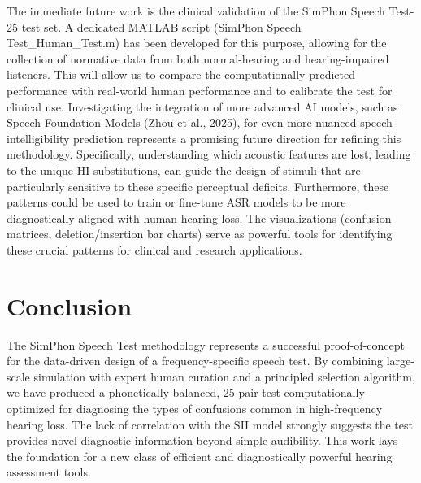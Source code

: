 \documentclass{article}
\begin{document}
The immediate future work is the clinical validation of the SimPhon Speech Test-25 test set. A dedicated MATLAB script (SimPhon Speech Test\_Human\_Test.m) has been developed for this purpose, allowing for the collection of normative data from both normal-hearing and hearing-impaired listeners. This will allow us to compare the computationally-predicted performance with real-world human performance and to calibrate the test for clinical use. Investigating the integration of more advanced AI models, such as Speech Foundation Models (Zhou et al., 2025), for even more nuanced speech intelligibility prediction represents a promising future direction for refining this methodology. Specifically, understanding which acoustic features are lost, leading to the unique HI substitutions, can guide the design of stimuli that are particularly sensitive to these specific perceptual deficits. Furthermore, these patterns could be used to train or fine-tune ASR models to be more diagnostically aligned with human hearing loss. The visualizations (confusion matrices, deletion/insertion bar charts) serve as powerful tools for identifying these crucial patterns for clinical and research applications.

\section{Conclusion}
The SimPhon Speech Test methodology represents a successful proof-of-concept for the data-driven design of a frequency-specific speech test. By combining large-scale simulation with expert human curation and a principled selection algorithm, we have produced a phonetically balanced, 25-pair test computationally optimized for diagnosing the types of confusions common in high-frequency hearing loss. The lack of correlation with the SII model strongly suggests the test provides novel diagnostic information beyond simple audibility. This work lays the foundation for a new class of efficient and diagnostically powerful hearing assessment tools.
\end{document}
